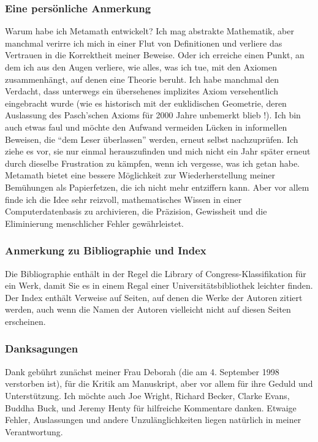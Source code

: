 \subsubsection{Eine persönliche Anmerkung}
Warum habe ich Metamath entwickelt?  Ich mag abstrakte Mathematik, aber manchmal verirre ich mich in einer Flut von Definitionen und verliere das Vertrauen in die Korrektheit meiner Beweise.  Oder ich erreiche einen Punkt, an dem ich aus den Augen verliere, wie alles, was ich tue, mit den Axiomen zusammenhängt, auf denen eine Theorie beruht. Ich habe manchmal den Verdacht, dass unterwegs ein übersehenes implizites Axiom versehentlich eingebracht wurde (wie es historisch mit der euklidischen Geometrie, deren Auslassung des Pasch'schen Axioms für 2000 Jahre unbemerkt blieb \cite[p.~160]{Davis}!).
Ich bin auch etwas faul und möchte den Aufwand vermeiden Lücken in informellen Beweisen, die "`dem Leser überlassen"' werden, erneut selbst nachzuprüfen. Ich ziehe es vor, sie nur einmal herauszufinden und mich nicht ein Jahr später erneut durch dieselbe Frustration zu kämpfen, wenn ich vergesse, was ich getan habe.  Metamath bietet eine bessere Möglichkeit zur Wiederherstellung meiner Bemühungen als Papierfetzen, die ich nicht mehr entziffern kann.  Aber vor allem finde ich die Idee sehr reizvoll, mathematisches Wissen in einer Computerdatenbasis zu archivieren, die Präzision, Gewissheit und die Eliminierung menschlicher Fehler gewährleistet.


\subsubsection{Anmerkung zu Bibliographie und Index}

Die Bibliographie enthält in der Regel die Library of Congress-Klassifikation für ein Werk, damit Sie es in einem Regal einer Universitätsbibliothek leichter finden.  Der Index enthält Verweise auf Seiten, auf denen die Werke der Autoren zitiert werden, auch wenn die Namen der Autoren vielleicht nicht auf diesen Seiten erscheinen.


\subsubsection{Danksagungen}

Dank gebührt zunächst meiner Frau Deborah (die am 4. September 1998 verstorben ist), für die Kritik am Manuskript, aber vor allem für ihre Geduld und Unterstützung.  Ich möchte auch Joe Wright, Richard Becker, Clarke Evans, Buddha Buck, und Jeremy Henty für hilfreiche Kommentare danken.  Etwaige Fehler, Auslassungen und andere Unzulänglichkeiten liegen natürlich in meiner Verantwortung.


